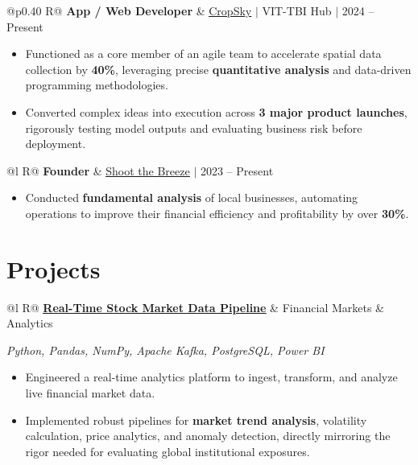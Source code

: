 \documentclass[a4paper,10pt]{article}
\newcommand{\ulink}[2]{\href{#1}{\uline{#2}}}
\newcommand{\subheading}[1]{{\color[HTML]{0A0A0A}\fontsize{12}{14}\selectfont\bfseries #1}}
\newcommand{\techstack}[1]{{\color[HTML]{5C5C5C}\fontsize{10.5}{12.5}\selectfont\itshape #1}}
\newcommand{\meta}[1]{{\color[HTML]{5C5C5C}\fontsize{10.5}{12.5}\selectfont #1}}
\begin{document}
\begin{tabularx}{\linewidth}{@{}p{0.40\linewidth} R@{}}
\subheading{App / Web Developer} & \meta{\ulink{https://sites.google.com/view/cropsky/home}{CropSky} $|$ VIT-TBI Hub $|$ 2024 -- Present}
\end{tabularx}
\begin{itemize}[nosep, leftmargin=1.5em, itemsep=0pt, topsep=0pt]
  \item {\color[HTML]{0A0A0A}\fontsize{11}{14}\selectfont Functioned as a core member of an agile team to accelerate spatial data collection by \textbf{40\%}, leveraging precise \textbf{quantitative analysis} and data-driven programming methodologies.}
  \item {\color[HTML]{0A0A0A}\fontsize{11}{14}\selectfont Converted complex ideas into execution across \textbf{3 major product launches}, rigorously testing model outputs and evaluating business risk before deployment.}
\end{itemize}



\begin{tabularx}{\linewidth}{@{}l R@{}}
\subheading{Founder} & \meta{\ulink{https://shoot-the-breeze.vercel.app}{Shoot the Breeze} $|$ 2023 -- Present}
\end{tabularx}
\begin{itemize}[nosep, leftmargin=1.5em, itemsep=0pt, topsep=0pt]
  \item {\color[HTML]{0A0A0A}\fontsize{11}{14}\selectfont Conducted \textbf{fundamental analysis} of local businesses, automating operations to improve their financial efficiency and profitability by over \textbf{30\%}.}
\end{itemize}



\section{Projects}


\begin{tabularx}{\linewidth}{@{}l R@{}}
\subheading{\ulink{https://github.com/su-jin1425/Real-Time-Stock-Market-Data-Pipeline}{Real-Time Stock Market Data Pipeline}} & \meta{Financial Markets \& Analytics}
\end{tabularx}

\techstack{Python, Pandas, NumPy, Apache Kafka, PostgreSQL, Power BI}
\begin{itemize}[nosep, leftmargin=1.5em, itemsep=0pt, topsep=0pt]
  \item {\color[HTML]{0A0A0A}\fontsize{11}{14}\selectfont Engineered a real-time analytics platform to ingest, transform, and analyze live financial market data.}
  \item {\color[HTML]{0A0A0A}\fontsize{11}{14}\selectfont Implemented robust pipelines for \textbf{market trend analysis}, volatility calculation, price analytics, and anomaly detection, directly mirroring the rigor needed for evaluating global institutional exposures.}
\end{itemize}
\end{document}
